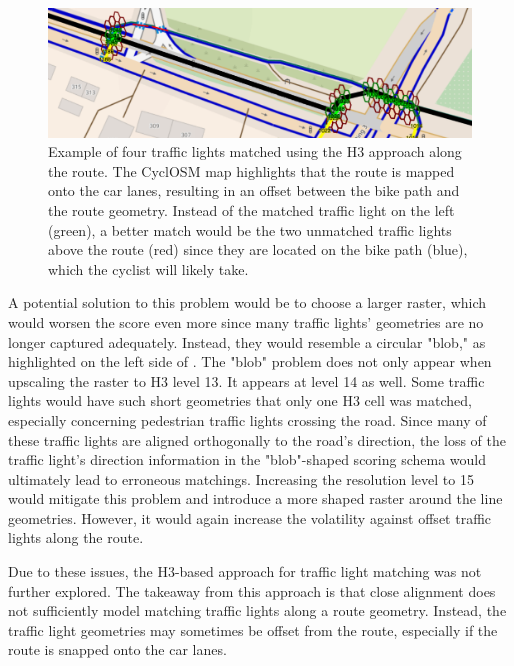 \begin{figure}[t]
\centering
\includegraphics[width=\linewidth]{images/sg-selection-h3-example.png}
\caption{Example of four traffic lights matched using the H3 approach along the route. The CyclOSM map highlights that the route is mapped onto the car lanes, resulting in an offset between the bike path and the route geometry. Instead of the matched traffic light on the left (green), a better match would be the two unmatched traffic lights above the route (red) since they are located on the bike path (blue), which the cyclist will likely take.}
\label{fig:sg-selection-h3-example}
\end{figure}

A potential solution to this problem would be to choose a larger raster, which would worsen the score even more since many traffic lights' geometries are no longer captured adequately. Instead, they would resemble a circular "blob," as highlighted on the left side of . The "blob" problem does not only appear when upscaling the raster to H3 level 13. It appears at level 14 as well. Some traffic lights would have such short geometries that only one H3 cell was matched, especially concerning pedestrian traffic lights crossing the road. Since many of these traffic lights are aligned orthogonally to the road's direction, the loss of the traffic light's direction information in the "blob"-shaped scoring schema would ultimately lead to erroneous matchings. Increasing the resolution level to 15 would mitigate this problem and introduce a more shaped raster around the line geometries. However, it would again increase the volatility against offset traffic lights along the route.

Due to these issues, the H3-based approach for traffic light matching was not further explored. The takeaway from this approach is that close alignment does not sufficiently model matching traffic lights along a route geometry. Instead, the traffic light geometries may sometimes be offset from the route, especially if the route is snapped onto the car lanes.

